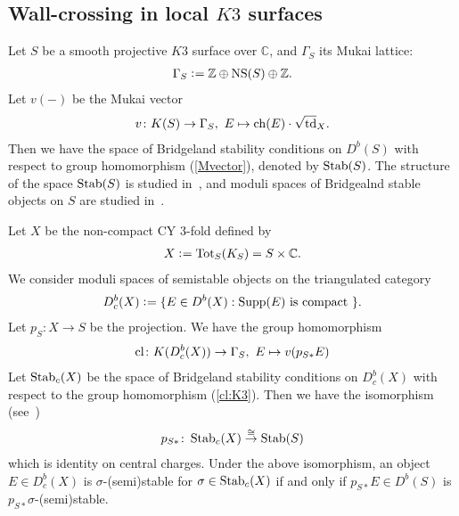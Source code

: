 \documentclass[11pt]{amsart}
\theoremstyle{plain}
\theoremstyle{definition}
\theoremstyle{remark}
\newcommand{\Supp}{\mathop{\rm Supp}\nolimits}
\newcommand{\ch}{\mathop{\rm ch}\nolimits}
\newcommand{\td}{\mathop{\rm td}\nolimits}
\newcommand{\Stab}{\mathop{\rm Stab}\nolimits}
\newcommand{\cl}{\mathop{\rm cl}\nolimits}
\begin{document}
\subsection{Wall-crossing in local $K3$ surfaces}
Let $S$ be a smooth projective $K3$ surface over $\mathbb{C}$, and 
$\Gamma_S$ its Mukai lattice: 
\begin{align*}
\Gamma_S \cneq \mathbb{Z} \oplus \mathrm{NS}(S) \oplus \mathbb{Z}.
\end{align*}
Let $v(-)$ be the Mukai vector 
\begin{align}\label{Mvector}
v \colon K(S) \to \Gamma_S, \ 
E \mapsto \ch(E) \cdot \sqrt{\td}_X. 
\end{align}
Then we have the space of Bridgeland 
stability conditions on 
$D^b(S)$
with respect to 
group homomorphism (\ref{Mvector}), 
denoted by $\Stab(S)$. 
The structure of the space $\Stab(S)$
is studied in~\cite{Brs2}, and 
moduli spaces of Bridgealnd stable 
objects on $S$ are studied in~\cite{MR3194493}. 

Let $X$ be the non-compact CY 3-fold 
defined by 
\begin{align*}
X \cneq \mathrm{Tot}_S(K_S)=S \times \mathbb{C}. 
\end{align*}
We consider moduli spaces of semistable objects 
on the triangulated category
\begin{align*}
D^b_c(X) \cneq \{E \in D^b(X) : 
\Supp(E) \mbox{ is compact }\}. 
\end{align*}
Let $p_S \colon X \to S$ be the projection. 
We have the group homomorphism
\begin{align}\label{cl:K3}
\cl \colon K(D^b_c(X)) \to \Gamma_S, \ 
E \mapsto v(p_{S\ast}E)
\end{align}
Let $\Stab_c(X)$ be the space of 
Bridgeland stability conditions on 
$D^b_c(X)$
with respect to the group homomorphism (\ref{cl:K3}).
Then we have the isomorphism
(see~\cite[Theorem~6.5, Lemma~5.3]{Tst2})
\begin{align*}
p_{S\ast} \colon 
\Stab_{c}(X) \stackrel{\cong}{\to} \Stab(S)
\end{align*}
which is identity on central charges.
Under the above isomorphism, 
an object $E \in D_{c}^b(X)$ is 
$\sigma$-(semi)stable for $\sigma \in \Stab_{c}(X)$
if and only if $p_{S\ast}E \in D^b(S)$
 is $p_{S\ast}\sigma$-(semi)stable. 
\end{document}
